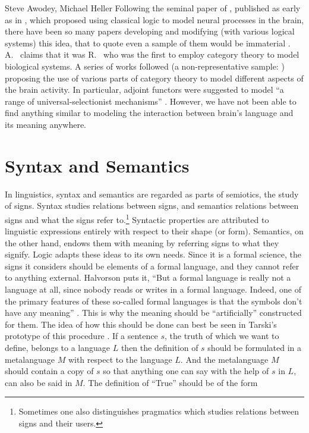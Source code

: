 \begin{artengenv2auth}{Steve Awodey, Michael Heller}
Following the seminal paper of %
\citeauthor{McCulloch}, published as early as in \cite*{McCulloch}, which proposed using classical logic to model neural processes in the brain, there have been so many papers developing and modifying (with various logical systems) this idea, that to quote even a sample of them would be immaterial \parencite[for a relatively recent state of art see a short review][]{Koch}. A.~\citeauthor{Ehresmann} claims that it was R.~\citeauthor{Rosen} who was the first to employ category theory to model biological systems. A series of works followed (a non-representative sample: \parencites{Gomez}{Healy}{Mizraji}{Naotsugu}) proposing  the use of various parts of category theory to model different aspects of the brain activity. In particular, adjoint functors were suggested to model ``a range of universal-selectionist mechanisms'' \parencite{Ellerman}. However, we have not been able to find anything similar to modeling the interaction between brain's language and its meaning anywhere.

\section{Syntax and Semantics}
In linguistics, syntax and semantics are regarded as parts of semiotics, the study of signs. Syntax studies relations between signs, and semantics relations between signs and what the signs refer to.\footnote{Sometimes one also distinguishes pragmatics which studies relations between signs and their users.} Syntactic properties are attributed to linguistic expressions entirely with respect to their shape (or form). Semantics, on the other hand, endows them with meaning by referring signs to what they signify. Logic adapts these ideas to its own needs. Since it is a formal science, the signs it considers should be elements of a formal language, and they cannot refer to anything external. Halvorson puts it, ``But a formal language is really not a language at all, since nobody reads or writes in a formal language. Indeed, one of the primary features of these so-called formal languages is that the symbols don't have any meaning'' \parencite{Halvorson2016}. This is why the meaning should be ``artificially'' constructed for them. The idea of how this should be done can best be seen in Tarski's prototype of this procedure \parencite{Tarski}. If a sentence $s$, the truth of which we want to define, belongs to a language $L$ then the definition of $s$ should be formulated in a metalanguage $M$ with respect to the language $L$. And the metalanguage $M$ should contain a copy of $s$ so that anything one can say with the help of $s$ in $L$, can also be said in $M$. The definition of ``True'' should be of the form


\end{artengenv2auth}
